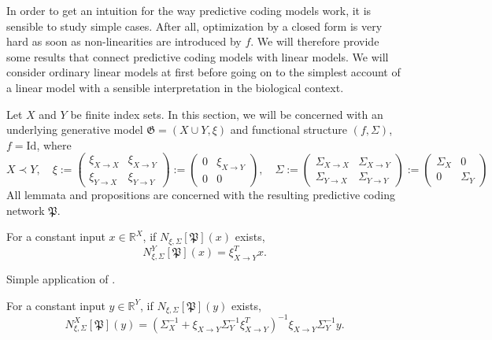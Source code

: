 \documentclass[a4paper,11pt]{report}
\begin{document}
\begin{Par}
In order to get an intuition for the way predictive coding models work, it is sensible to study simple cases. After all, optimization by a closed form is very hard as soon as non-linearities are introduced by $f$. We will therefore provide some results that connect predictive coding models with linear models. We will consider ordinary linear models at first before going on to the simplest account of a linear model with a sensible interpretation in the biological context.
\end{Par}

\begin{Par}
Let $X$ and $Y$ be finite index sets. In this section, we will be concerned with an underlying generative model $\mathfrak{G}=(X\cup Y,\xi)$ and functional structure $(f,\Sigma)$, $f=\text{Id}$, where
\[
X\prec Y,\quad
\xi:=
\begin{pmatrix}
\xi_{X\to X} & \xi_{X\to Y}\\
\xi_{Y\to X} & \xi_{Y\to Y}
\end{pmatrix}
:=
\begin{pmatrix}
0 & \xi_{X\to Y}\\
0 & 0
\end{pmatrix},
\quad
\Sigma:=
\begin{pmatrix}
\Sigma_{X\to X} & \Sigma_{X\to Y}\\
\Sigma_{Y\to X} & \Sigma_{Y\to Y}
\end{pmatrix}:=
\begin{pmatrix}
\Sigma_X & 0\\
0 & \Sigma_Y
\end{pmatrix}
\]
All lemmata and propositions are concerned with the resulting predictive coding network $\mathfrak{P}$.
\end{Par}

\begin{Cor}
For a constant input $x\in\mathbb{R}^X$, if $N_{\xi,\Sigma}[\mathfrak{P}](x)$ exists,
\[
N^Y_{\xi,\Sigma}[\mathfrak{P}](x)=\xi^T_{X\to Y}x.
\]
\end{Cor}

\begin{Bew}
Simple application of .
\end{Bew}

\begin{Pro}\label{y-to-x}
For a constant input $y\in\mathbb{R}^{Y}$, if $N_{\xi,\Sigma}[\mathfrak{P}](y)$ exists,
\begin{equation}\label{eq:y-to-x}
N_{\xi,\Sigma}^X[\mathfrak{P}](y)=\left(\Sigma_X^{-1}+\xi_{X\to Y}\Sigma_Y^{-1}\xi_{X\to Y}^T\right)^{-1}\xi_{X\to Y}\Sigma_Y^{-1}y.
\end{equation}
\end{Pro}
\end{document}
